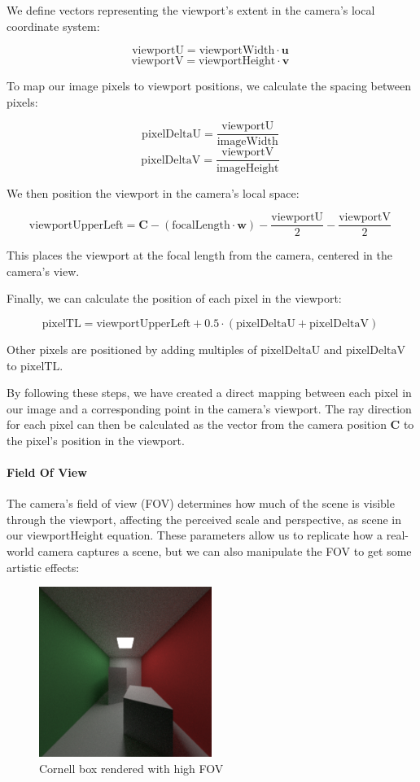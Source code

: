 \documentclass[12pt]{article}
\begin{document}
We define vectors representing the viewport's extent in the camera's local coordinate system:

$$ \text{viewportU} = \text{viewportWidth} \cdot \mathbf{u}
    \ $$
$$ \text{viewportV} = \text{viewportHeight} \cdot \mathbf{v}
    \ $$

To map our image pixels to viewport positions, we calculate the spacing between pixels:

$$ \text{pixelDeltaU} = \frac{\text{viewportU}}{\text{imageWidth}}
    \ $$
$$ \text{pixelDeltaV} = \frac{\text{viewportV}}{\text{imageHeight}}
    \ $$

We then position the viewport in the camera's local space:

$$ \text{viewportUpperLeft} = \mathbf{C} - (\text{focalLength} \cdot \mathbf{w}) - \frac{\text{viewportU}}{2} - \frac{\text{viewportV}}{2}
    \ $$

This places the viewport at the focal length from the camera, centered in the camera's view.

Finally, we can calculate the position of each pixel in the viewport:

$$ \text{pixelTL} = \text{viewportUpperLeft} + 0.5 \cdot (\text{pixelDeltaU} + \text{pixelDeltaV})
    \ $$

Other pixels are positioned by adding multiples of $\text{pixelDeltaU}$ and $\text{pixelDeltaV}$ to $\text{pixelTL}$.

By following these steps, we have created a direct mapping between each pixel in our image and a corresponding point in the camera's viewport. The ray direction for each pixel can then be calculated as the vector from the camera position $\mathbf{C}$ to the pixel's position in the viewport.


\paragraph{Field Of View} The camera's field of view (FOV) determines how much of the scene is visible through the viewport, affecting the perceived scale and perspective, as scene in our $\text{viewportHeight}$ equation.
These parameters allow us to replicate how a real-world camera captures a scene, but we can also manipulate the FOV to get some artistic effects:

\begin{figure}[H]
    \centering
    \includegraphics[width=0.5\textwidth]{images/artsy_rep/highFOV_cornell.png}
    \caption{Cornell box rendered with high FOV}
    \label{fig:highFOVBox}
\end{figure}
\end{document}
